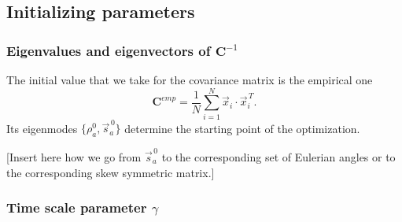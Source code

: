 \documentclass[preprint,amsmath,amssymb,superscriptaddress,showpacs,pre]{revtex4-1}
\let\originalleft\left
\let\originalright\right
\renewcommand{\left}{\mathopen{}\mathclose\bgroup\originalleft}
\renewcommand{\right}{\aftergroup\egroup\originalright}
\def\vx{\vec x}
\newcommand{\vsa}{\vec{s}_a}
\begin{document}
\subsection{Initializing parameters} %
\label{sub:initializing_parameters}

	\subsubsection{Eigenvalues and eigenvectors of $\mathbf{C}^{-1}$} %
	\label{ssub:eigenvalues_and_eigenvectors}

	The initial value that we take for the covariance matrix is the empirical one
	\begin{equation*}
		\mathbf{C}^{emp} = \frac{1}{N}\sum_{i=1}^{N}\vx_i \cdot\vx_i^{\,T}.
	\end{equation*}
	Its eigenmodes $\{\rho^0_a, \vsa^{\,0}\}$ determine the starting point of the optimization. 

	[Insert here how we go from $\vsa^{\,0}$ to the corresponding set of Eulerian angles or to the corresponding skew symmetric matrix.]
	




	\subsubsection{Time scale parameter $\gamma$}
\end{document}
